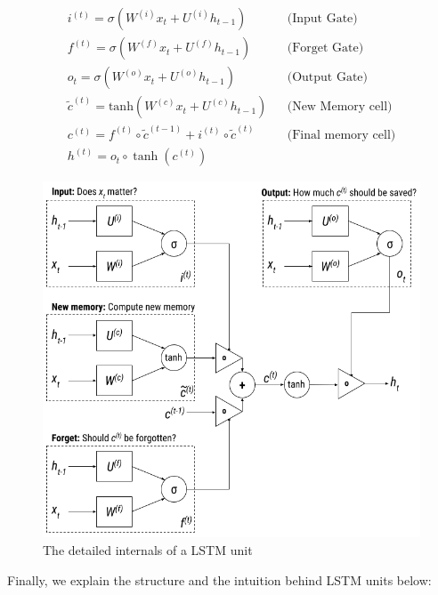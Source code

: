 \begin{equation}
\begin{aligned}
	i^{(t)} = \sigma(W^{(i)}x_t + U^{(i)}h_{t-1}) && \text{(Input \ Gate)} \\
	f^{(t)} = \sigma(W^{(f)}x_t + U^{(f)}h_{t-1}) && \text{(Forget \ Gate)} \\
	o_t = \sigma(W^{(o)}x_t + U^{(o)}h_{t-1}) && \text{(Output \ Gate)} \\
	\widetilde{c}^{(t)} = \text{tanh}(W^{(c)}x_t + U^{(c)}h_{t-1}) && \text{(New \ Memory \ cell)} \\
	c^{(t)} = f^{(t)} \circ \widetilde{c}^{(t-1)} + i^{(t)} \circ \widetilde{c}^{(t)} && \text{(Final \ memory \ cell)} \\
	h^{(t)} = o_t \circ \tanh(c^{(t)})
\end{aligned}
\end{equation}


\begin{figure}[!htb]
    \centering
    \includegraphics[scale=0.55]{Figures/lstm-unit.png}
    \caption{The detailed internals of a LSTM unit}
    \label{fig:lstmunit}
\end{figure}

Finally, we explain the structure and the intuition behind LSTM units below:


